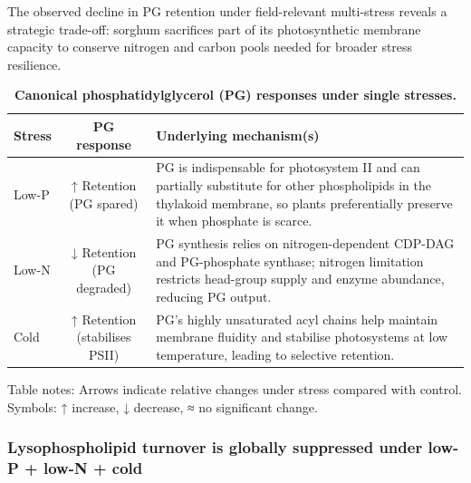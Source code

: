 \documentclass[10pt,letterpaper]{article}
\begin{document}
The observed decline in PG retention under field-relevant multi-stress
reveals a strategic trade-off: sorghum sacrifices part of its
photosynthetic membrane capacity to conserve nitrogen and carbon pools
needed for broader stress resilience.




\begin{table}[!ht]
  \begin{adjustwidth}{-2.25in}{0in} %
    \centering
    \caption{{\bf Canonical phosphatidylglycerol (PG) responses under single stresses.}}
    \begin{tabular}{|l|c|p{4in}|}
      \hline
      \textbf{Stress} & \textbf{PG response} & \textbf{Underlying mechanism(s)} \\ \hline
      Low-P  & ↑ Retention (PG spared) & PG is indispensable for photosystem II and can partially substitute for other phospholipids in the thylakoid membrane, so plants preferentially preserve it when phosphate is scarce. \\ \hline
      Low-N  & ↓ Retention (PG degraded) & PG synthesis relies on nitrogen-dependent CDP-DAG and PG-phosphate synthase; nitrogen limitation restricts head-group supply and enzyme abundance, reducing PG output. \\ \hline
      Cold   & ↑ Retention (stabilises PSII) & PG’s highly unsaturated acyl chains help maintain membrane fluidity and stabilise photosystems at low temperature, leading to selective retention. \\ \hline
    \end{tabular}
    \begin{flushleft}
      Table notes: Arrows indicate relative changes under stress compared with control. Symbols: ↑ increase, ↓ decrease, ≈ no significant change.
    \end{flushleft}
    \label{table:PG_responses}
  \end{adjustwidth}
\end{table}


\subsubsection*{Lysophospholipid turnover is globally suppressed under low-P + low-N + cold}
\end{document}
